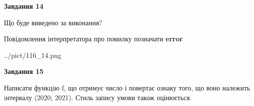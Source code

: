 \documentclass[11pt, ukrainian]{article}
\begin{document}
{\begin {large}
{\begin {center}\textbf{Завдання 14}\end {center}}\par
Що буде виведено за виконання? \par
Повідомлення інтерпретатора про помилку позначати \textbf{error}

\begin{center}
	{../pict/116_14.png}
\end{center}
\newpage

{\begin {center}\textbf{Завдання 15}\end {center}}\par

Написати функцiю f, що отримує число і повертає ознаку того, що воно належить iнтервалу (2020; 2021). Стиль запису умови також оцінюється.\par
\newpage

\end {large}}
\end{document}
